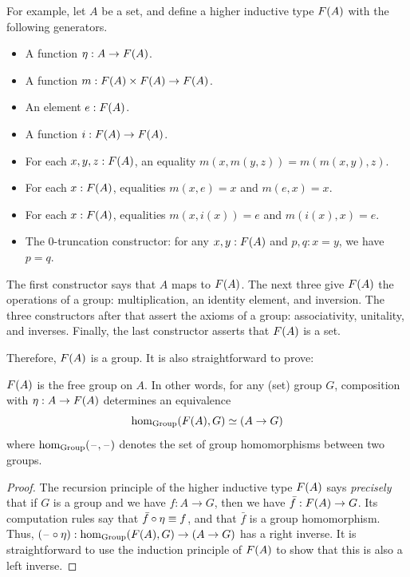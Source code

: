 %
%
For example, let $A$ be a set, and define a higher inductive type $F(A)$ with the following generators.
\begin{itemize}
\item A function $\eta:A\to F(A)$.
\item A function $m: F(A) \times F(A) \to F(A)$.
\item An element $e:F(A)$.
\item A function $i:F(A) \to F(A)$.
\item For each $x,y,z:F(A)$, an equality $m(x,m(y,z)) = m(m(x,y),z)$.
\item For each $x:F(A)$, equalities $m(x,e) = x$ and $m(e,x) = x$.
\item For each $x:F(A)$, equalities $m(x,i(x)) = e$ and $m(i(x),x) = e$.
\item The $0$-truncation constructor: for any $x,y:F(A)$ and $p,q:x=y$, we have $p=q$.
\end{itemize}
The first constructor says that $A$ maps to $F(A)$.
The next three give $F(A)$ the operations of a group: multiplication, an identity element, and inversion.
The three constructors after that assert the axioms of a group: associativity, unitality, and inverses.
Finally, the last constructor asserts that $F(A)$ is a set.

Therefore, $F(A)$ is a group.
It is also straightforward to prove:

\begin{thm}
  $F(A)$ is the free group on $A$.
  In other words, for any (set) group $G$, composition with $\eta:A\to F(A)$ determines an equivalence
  \[ \hom_{\mathrm{Group}}(F(A),G) \simeq (A\to G) \]
  where $\hom_{\mathrm{Group}}(\mathord{\hspace{1pt}\text{--}\hspace{1pt}},\mathord{\hspace{1pt}\text{--}\hspace{1pt}})$ denotes the set of group homomorphisms between two groups.
\end{thm}
\begin{proof}
  The recursion principle of the higher inductive type $F(A)$ says \emph{precisely} that if $G$ is a group and we have $f:A\to G$, then we have $\bar{f}:F(A) \to G$.
  Its computation rules say that $\bar{f}\circ \eta \equiv f$, and that $\bar f$ is a group homomorphism.
  Thus, $(\mathord{\hspace{1pt}\text{--}\hspace{1pt}}\circ \eta) :  \hom_{\mathrm{Group}}(F(A),G) \to (A\to G)$ has a right inverse.
  It is straightforward to use the induction principle of $F(A)$ to show that this is also a left inverse.
\end{proof}

